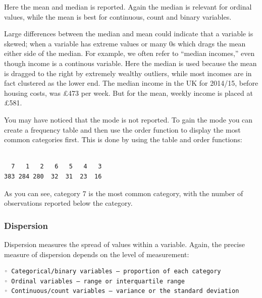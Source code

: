 \documentclass[]{article}
\newenvironment{Shaded}{\begin{snugshade}}{\end{snugshade}}
\newcommand{\DataTypeTok}[1]{\textcolor[rgb]{0.13,0.29,0.53}{#1}}
\newcommand{\KeywordTok}[1]{\textcolor[rgb]{0.13,0.29,0.53}{\textbf{#1}}}
\newcommand{\NormalTok}[1]{#1}
\newcommand{\OperatorTok}[1]{\textcolor[rgb]{0.81,0.36,0.00}{\textbf{#1}}}
\newcommand{\OtherTok}[1]{\textcolor[rgb]{0.56,0.35,0.01}{#1}}
\newcommand{\StringTok}[1]{\textcolor[rgb]{0.31,0.60,0.02}{#1}}
\begin{document}
Here the mean and median is reported. Again the median is relevant for ordinal values, while the mean is best for continuous, count and binary variables.

Large differences between the median and mean could indicate that a variable is skewed; when a variable has extreme values or many 0s which drags the mean either side of the median. For example, we often refer to ``median incomes,'' even though income is a continous variable. Here the median is used because the mean is dragged to the right by extremely wealthy outliers, while most incomes are in fact clustered as the lower end. The median income in the UK for 2014/15, before housing costs, was £473 per week. But for the mean, weekly income is placed at £581.

You may have noticed that the mode is not reported. To gain the mode you can create a frequency table and then use the order function to display the most common categories first. This is done by using the table and order functions:

\begin{Shaded}
\end{Shaded}

\begin{verbatim}

  7   1   2   6   5   4   3 
383 284 280  32  31  23  16 
\end{verbatim}

As you can see, category 7 is the most common category, with the number of observations reported below the category.

\hypertarget{dispersion}{%
\subsubsection{Dispersion}\label{dispersion}}

Dispersion measures the spread of values within a variable. Again, the precise measure of dispersion depends on the level of measurement:

\begin{verbatim}
◦ Categorical/binary variables – proportion of each category
◦ Ordinal variables – range or interquartile range
◦ Continuous/count variables – variance or the standard deviation
\end{verbatim}
\end{document}

